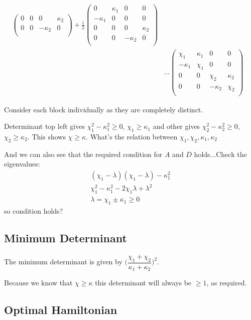 \documentclass[11pt,a4paper]{article}
\numberwithin{equation}{section}
\begin{document}
\begin{align*}
\begin{pmatrix}
	0 & 0 & 0 & \kappa_2\\
	0 & 0 & -\kappa_2 & 0\\
	\end{pmatrix}  + \frac{i}{2}\begin{pmatrix}
	0 & \kappa_1 & 0 & 0 \\
	-\kappa_1 & 0 & 0 & 0\\
	0 & 0 & 0 & \kappa_2\\
	0 & 0 & -\kappa_2 & 0\\
	\end{pmatrix}&\\
	&...\begin{pmatrix}
	\chi_1 & \kappa_1 & 0 & 0 \\
	-\kappa_1 & \chi_1 & 0 & 0\\
	0 & 0 & \chi_2 & \kappa_2\\
	0 & 0 & -\kappa_2 & \chi_2\\
	\end{pmatrix}&	
	\end{align*}
	
	Consider each block individually as they are completely distinct.
	
	Determinant top left gives $\chi_{1}^2 - \kappa_{1}^2 \geq 0$, $\chi_1 \geq \kappa_1$ and other gives $\chi_{2}^2 - \kappa_{2}^2 \geq 0$, $\chi_2 \geq \kappa_2$. This shows $\chi \geq \kappa$. \color{red} What's the relation between $\chi_1, \chi_2, \kappa_1, \kappa_2$
	
	And we can also see that the required condition for $A$ and $D$ holds...Check the eigenvalues: 
	\begin{align*}
	&(\chi_1- \lambda)(\chi_1- \lambda) - \kappa_{1}^2&\\
	&\chi_{1}^2 - \kappa_{1}^2 - 2\chi_{1}\lambda + \lambda^2&\\
	&\lambda = \chi_1 \pm \kappa_1 \geq 0& \tag*{as $\chi_1 \geq \kappa_1$}
	\end{align*} so condition holds? \color{black}

	\subsection{Minimum Determinant}
	The minimum determinant is given by $\Big(\dfrac{\chi_1 + \chi_2}{\kappa_1 + \kappa_2}\Big)^2$.  
	
	Because we know that $\chi \geq \kappa$ this determinant will always be $\geq 1$, as required. 
	
	\subsection{Optimal Hamiltonian}
	
\end{document}
